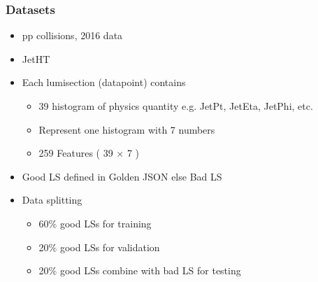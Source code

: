 \documentclass{beamer}
\begin{document}
\begin{frame}
\frametitle{Datasets}
\begin{itemize}
    \item pp collisions, 2016 data
    \item JetHT
    \item Each lumisection (datapoint) contains
    \begin{itemize}
        \item 39 histogram of physics quantity e.g. JetPt, JetEta, JetPhi, etc.
        \item Represent one histogram with 7 numbers
        \item 259 Features ( 39 $\times$ 7 )
    \end{itemize}
    \item \textcolor[RGB]{0,128,0}{Good LS} defined in Golden JSON else \textcolor[RGB]{255,0,0}{Bad LS}
    \item Data splitting
    \begin{itemize}
        \item \textcolor[RGB]{0,128,0}{60$\%$} good LSs for training
        \item \textcolor[RGB]{0,128,0}{20$\%$} good LSs for validation
        \item \textcolor[RGB]{128,0,128}{20$\%$} good LSs combine with bad LS for testing
    \end{itemize}
\end{itemize}
\end{frame}
\end{document}
